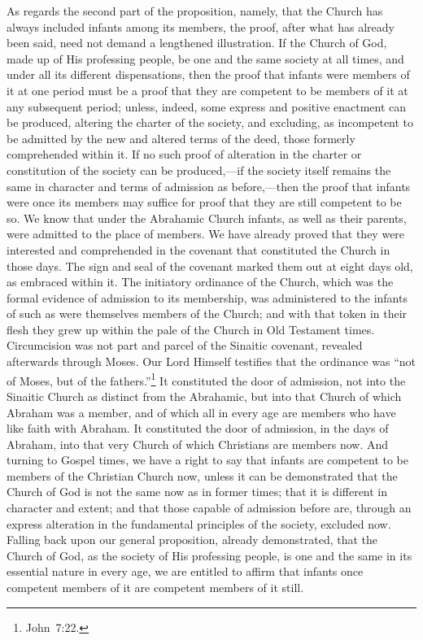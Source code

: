 \documentclass[
  english,
]{book}
\begin{document}
As regards the second part of the proposition, namely, that the Church has always included infants among its members, the proof, after what has already been said, need not demand a lengthened illustration. If the Church of God, made up of His professing people, be one and the same society at all times, and under all its different dispensations, then the proof that infants were members of it at one period must be a proof that they are competent to be members of it at any subsequent period; unless, indeed, some express and positive enactment can be produced, altering the charter of the society, and excluding, as incompetent to be admitted by the new and altered terms of the deed, those formerly comprehended within it. If no such proof of alteration in the charter or constitution of the society can be produced,---if the society itself remains the same in character and terms of admission as before,---then the proof that infants were once its members may suffice for proof that they are still competent to be so. We know that under the Abrahamic Church infants, as well as their parents, were admitted to the place of members. We have already proved that they were interested and comprehended in the covenant that constituted the Church in those days. The sign and seal of the covenant marked them out at eight days old, as embraced within it. The initiatory ordinance of the Church, which was the formal evidence of admission to its membership, was administered to the infants of such as were themselves members of the Church; and with that token in their flesh they grew up within the pale of the Church in Old Testament times. Circumcision was not part and parcel of the Sinaitic covenant, revealed afterwards through Moses. Our Lord Himself testifies that the ordinance was ``not of Moses, but of the fathers.''\footnote{John~7:22.} It constituted the door of admission, not into the Sinaitic Church as distinct from the Abrahamic, but into that Church of which Abraham was a member, and of which all in every age are members who have like faith with Abraham. It constituted the door of admission, in the days of Abraham, into that very Church of which Christians are members now. And turning to Gospel times, we have a right to say that infants are competent to be members of the Christian Church now, unless it can be demonstrated that the Church of God is not the same now as in former times; that it is different in character and extent; and that those capable of admission before are, through an express alteration in the fundamental principles of the society, excluded now. Falling back upon our general proposition, already demonstrated, that the Church of God, as the society of His professing people, is one and the same in its essential nature in every age, we are entitled to affirm that infants once competent members of it are competent members of it still.
\end{document}
